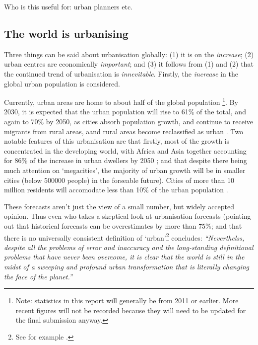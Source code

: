 Who is this useful for: urban planners etc.

\subsection{The world is urbanising}
Three things can be said about urbanisation globally: (1) it is on the \emph{increase}; (2) urban centres are economically \emph{important}; and (3) it follows from (1) and (2) that the continued trend of urbanisation is \emph{innevitable}. Firstly, the \emph{increase} in the global urban population is considered.

Currently, urban areas are home to about half of the global population \citep{AREAS2012}\footnote{Note: statistics in this report will generally be from 2011 or earlier. More recent figures will not be recorded because they will need to be updated for the final submission anyway.}. By 2030, it is expected that the urban population will rise to 61\% of the total, and again to 70\% by 2050, as cities absorb population growth, and continue to receive migrants from rural areas, aand rural areas become reclassified as urban \citep{Cohen2006}. Two notable features of this urbanisation are that firstly, most of the growth is concentrated in the developing world, with Africa and Asia together accounting for 86\% of the increase in urban dwellers by 2050 \citep{York2011}; and that despite there being much attention on `megacities', the majority of urban growth will be in smaller cities (below 500000 people) in the forseable future). Cities of more than 10 million residents will accomodate less than 10\% of the urban population \citep{Cohen2006}.

These forecasts aren't just the view of a small number, but widely accepted opinion. Thus even \citet{Cohen2004} who takes a skeptical look at urbanisation forecasts (pointing out that historical forecasts can be overestimates by more than 75\%; and that there is no universally consistent definition of `urban'\footnote{See for example \citet{DepartmentforCommunitiesandLocalGovernment2006}.} concludes: \emph{``Neverthelss, despite all the problems of error and inaccuracy and the long-standing definitional problems that have never been overcome, it is clear that the world is still in the midst of a sweeping and profound urban transformation that is literally changing the face of the planet.''}

